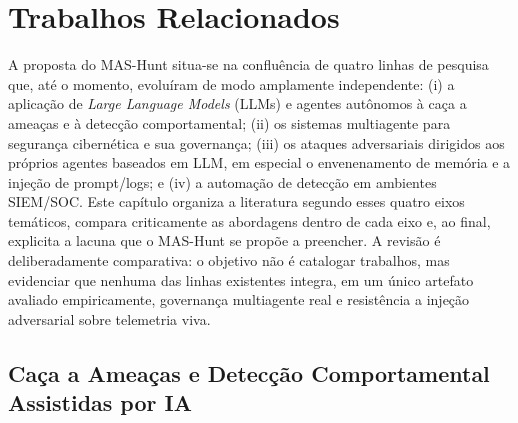 
\chapter{Trabalhos Relacionados}
\label{cap:trabalhos-relacionados}

A proposta do MAS-Hunt situa-se na confluência de quatro linhas de pesquisa que,
até o momento, evoluíram de modo amplamente independente: (i) a aplicação de
\textit{Large Language Models} (LLMs) e agentes autônomos à caça a ameaças e à
detecção comportamental; (ii) os sistemas multiagente para segurança
cibernética e sua governança; (iii) os ataques adversariais dirigidos aos
próprios agentes baseados em LLM, em especial o envenenamento de memória e a
injeção de prompt/logs; e (iv) a automação de detecção em ambientes
SIEM/SOC. Este capítulo organiza a literatura segundo esses quatro eixos
temáticos, compara criticamente as abordagens dentro de cada eixo e, ao final,
explicita a lacuna que o MAS-Hunt se propõe a preencher. A revisão é deliberadamente
comparativa: o objetivo não é catalogar trabalhos, mas evidenciar que nenhuma das
linhas existentes integra, em um único artefato avaliado empiricamente,
governança multiagente real e resistência a injeção adversarial sobre telemetria
viva.

\section{Caça a Ameaças e Detecção Comportamental Assistidas por IA}
\label{sec:rel-hunting-ia}

